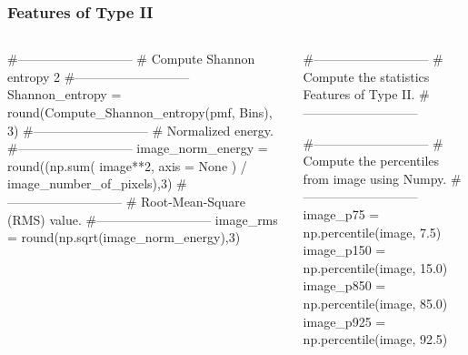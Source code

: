 \begin{frame}[fragile]
    \frametitle{Features of Type II}
\begin{columns}
    \begin{roundedcodebox}
    \begin{python}  
    #---------------------------   
    # Compute Shannon entropy 2
    #---------------------------   
    Shannon_entropy = round(Compute_Shannon_entropy(pmf, Bins), 3)
    #---------------------------         
    # Normalized energy.
    #---------------------------   
    image_norm_energy = round((np.sum( image**2, axis = None ) / image_number_of_pixels),3)
    #---------------------------   
    # Root-Mean-Square (RMS) value.
    #---------------------------   
    image_rms = round(np.sqrt(image_norm_energy),3)  
\end{python}
\end{roundedcodebox}
    \begin{roundedcodebox}
    \begin{python}  
    #---------------------------   
    # Compute the statistics Features of Type II.
    #---------------------------   
           
    #---------------------------   
    # Compute the percentiles from image using Numpy.
    #---------------------------   
    image_p75 = np.percentile(image, 7.5)
    image_p150 = np.percentile(image, 15.0)      
    image_p850 = np.percentile(image, 85.0)        
    image_p925 = np.percentile(image, 92.5)  
\end{python}
\end{roundedcodebox}
    \end{columns}
\end{frame}

